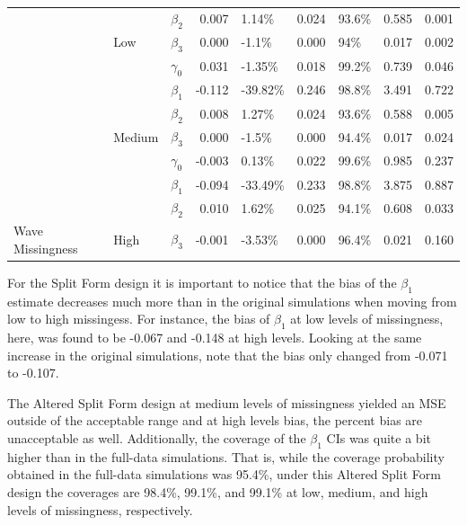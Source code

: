 \documentclass{svjour3}\usepackage[]{graphicx}\usepackage[]{color}
\newenvironment{knitrout}{}{} %
\begin{document}
\begin{knitrout}
\begin{table}[!h]
{\begin{tabular}[t]{l|l|l|r|l|r|l|r|r}
 &  & $\beta_2$ & 0.007 & 1.14\% & 0.024 & 93.6\% & 0.585 & 0.001\\

 & \multirow{-4}{*}{\raggedright\arraybackslash Low} & $\beta_3$ & 0.000 & -1.1\% & 0.000 & 94\% & 0.017 & 0.002\\

 &  & $\gamma_0$ & 0.031 & -1.35\% & 0.018 & 99.2\% & 0.739 & 0.046\\

 &  & $\beta_1$ & -0.112 & -39.82\% & 0.246 & 98.8\% & 3.491 & 0.722\\

 &  & $\beta_2$ & 0.008 & 1.27\% & 0.024 & 93.6\% & 0.588 & 0.005\\

 & \multirow{-4}{*}{\raggedright\arraybackslash Medium} & $\beta_3$ & 0.000 & -1.5\% & 0.000 & 94.4\% & 0.017 & 0.024\\

 &  & $\gamma_0$ & -0.003 & 0.13\% & 0.022 & 99.6\% & 0.985 & 0.237\\

 &  & $\beta_1$ & -0.094 & -33.49\% & 0.233 & 98.8\% & 3.875 & 0.887\\

 &  & $\beta_2$ & 0.010 & 1.62\% & 0.025 & 94.1\% & 0.608 & 0.033\\

\multirow{-12}{*}{\raggedright\arraybackslash Wave Missingness} & \multirow{-4}{*}{\raggedright\arraybackslash High} & $\beta_3$ & -0.001 & -3.53\% & 0.000 & 96.4\% & 0.021 & 0.160\\
\hline
\end{tabular}}
\end{table}


\end{knitrout}

For the Split Form design it is important to notice that the bias of the $\beta_1$ estimate decreases much more than in the original simulations when moving from low to high missingess. For instance, the bias of $\beta_1$ at low levels of missingness, here, was found to be -0.067 and -0.148 at high levels. Looking at the same increase in the original simulations, note that the bias only changed from -0.071 to -0.107. \par

The Altered Split Form design at medium levels of missingness yielded an MSE outside of the acceptable range and at high levels bias, the percent bias are unacceptable as well. Additionally, the coverage of the $\beta_1$ CIs was quite a bit higher than in the full-data simulations. That is, while the coverage probability obtained in the full-data simulations was 95.4\%, under this Altered Split Form design the coverages are 98.4\%, 99.1\%, and 99.1\% at low, medium, and high levels of missingness, respectively. \par
\end{document}
